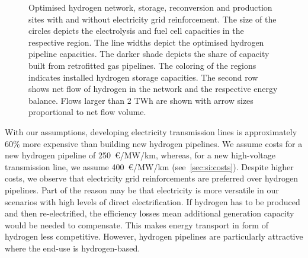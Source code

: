 \begin{figure}
    \centering
     \caption{Optimised hydrogen network, storage, reconversion and production
    sites with and without electricity grid reinforcement. The size of the
    circles depicts the electrolysis and fuel cell capacities in the respective
    region. The line widths depict the optimised hydrogen pipeline capacities.
    The darker shade depicts the share of capacity built from retrofitted gas
    pipelines. The coloring of the regions indicates installed hydrogen storage
    capacities. The second row shows net flow of hydrogen in the network and the
    respective energy balance. Flows larger than 2 TWh are shown with
    arrow sizes proportional to net flow volume.}
    \label{fig:h2-network}
\end{figure}

With our assumptions, developing electricity transmission lines is approximately
60\% more expensive than building new hydrogen pipelines. We assume costs for a
new hydrogen pipeline of 250~\euro/MW/km, whereas, for a new high-voltage
transmission line, we assume 400~\euro/MW/km (see~\cref{sec:si:costs}). Despite
higher costs, we observe that electricity grid reinforcements are preferred over
hydrogen pipelines. Part of the reason may be that electricity is more versatile
in our scenarios with high levels of direct electrification. If hydrogen has to
be produced and then re-electrified, the efficiency losses mean additional
generation capacity would be needed to compensate. This makes energy transport
in form of hydrogen less competitive. However, hydrogen pipelines are
particularly attractive where the end-use is hydrogen-based.

